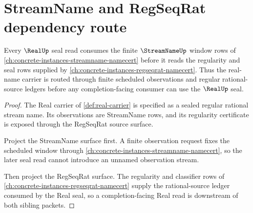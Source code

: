 \section{StreamName and RegSeqRat dependency route}
\label{sec:real-streamname-regseqrat-dependency-route}

\begin{theorem}
\label{thm:real-streamname-regseqrat-dependency-route}
Every $\RealUp$ seal read consumes the finite $\StreamNameUp$ window rows of \autoref{ch:concrete-instances-streamname-namecert} before it reads the regularity and seal rows supplied by \autoref{ch:concrete-instances-regseqrat-namecert}. Thus the real-name carrier is routed through finite scheduled observations and regular rational-source ledgers before any completion-facing consumer can use the $\RealUp$ seal.
\end{theorem}
\begin{proof}
The Real carrier of \autoref{def:real-carrier} is specified as a sealed regular rational stream name. Its observations are StreamName rows, and its regularity certificate is exposed through the RegSeqRat source surface.

Project the StreamName surface first. A finite observation request fixes the scheduled window through \autoref{ch:concrete-instances-streamname-namecert}, so the later seal read cannot introduce an unnamed observation stream.

Then project the RegSeqRat surface. The regularity and classifier rows of \autoref{ch:concrete-instances-regseqrat-namecert} supply the rational-source ledger consumed by the Real seal, so a completion-facing Real read is downstream of both sibling packets.
\end{proof}

